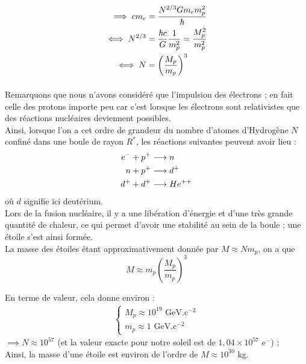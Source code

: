 \documentclass[../Notes de cours]{subfiles}
\begin{document}
\begin{align}
    \implies cm_e &= \frac{N^{2/3} G m_e m^2_p}{\hbar} \notag \\
    \iff N^{2/3} &= \frac{\hbar c}{G}\frac{1}{m^2_p} = \frac{M^2_p}{m^2_p} \notag \\
    \iff N &= \left( \frac{M_p}{m_p} \right)^3
\end{align}

\paragraph{} Remarquons que nous n'avons considéré que l'impulsion des électrons ; en fait celle des protons importe peu car c'est lorsque les électrons sont relativistes que des réactions nucléaires deviennent possibles. \\
Ainsi, lorsque l'on a cet ordre de grandeur du nombre d'atomes d'Hydrogène $N$ confiné dans une boule de rayon $R^*$, les réactions suivantes peuvent avoir lieu : 
\begin{align}
e^- + p^+ &\longrightarrow n \notag \\
n + p^+ &\longrightarrow d^+ \notag \\
d^+ + d^+ &\longrightarrow He^{++} \notag
\end{align}
où $d$ signifie ici deutérium. \\

Lors de la fusion nucléaire, il y a une libération d'énergie et d'une très grande quantité de chaleur, ce qui permet d'avoir une stabilité au sein de la boule ; une étoile s'est ainsi formée. \\ 

La masse des étoiles étant approximativement donnée par $ M \approx Nm_p$, on a que 
\begin{equation}
    M \approx m_p \left( \frac{M_p}{m_p} \right)^3
\end{equation}

En terme de valeur, cela donne environ : 
\begin{align*}
    \left\lbrace
\begin{array}{ccc}
M_p \approx 10^{19} \mbox{ GeV.c$^{-2}$} \\
m_p \approx 1 \mbox{ GeV.c$^{-2}$}
\end{array}\right.
\end{align*}
$\implies  N \approx 10^{57}$ (et la valeur exacte pour notre soleil est de $1,04 \times 10^{57}$ e$^-$) ; \\
Ainsi, la masse d'une étoile est environ de l'ordre de $M \approx 10^{30}$ kg. \\
\end{document}
